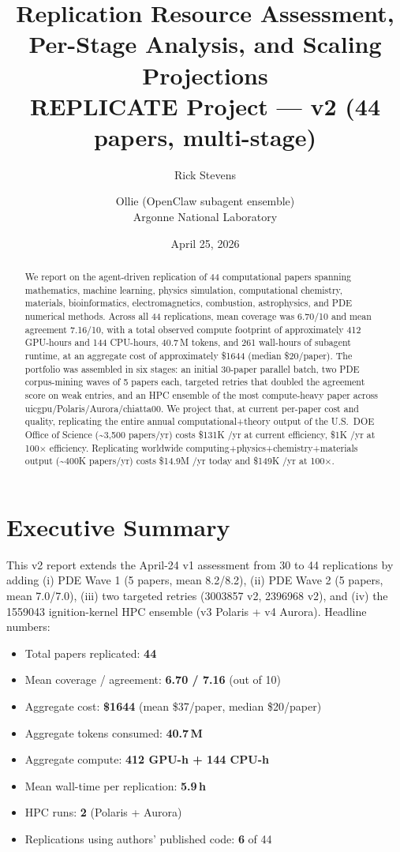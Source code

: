 \documentclass[11pt,letterpaper]{article}
\title{\textbf{Replication Resource Assessment, Per-Stage Analysis, and Scaling Projections}\\
\large REPLICATE Project --- v2 (44 papers, multi-stage)}
\author{Rick Stevens \and Ollie (OpenClaw subagent ensemble)\\Argonne National Laboratory}
\date{April 25, 2026}
\begin{document}
\maketitle

\begin{abstract}
We report on the agent-driven replication of 44 computational papers spanning mathematics, machine learning, physics simulation, computational chemistry, materials, bioinformatics, electromagnetics, combustion, astrophysics, and PDE numerical methods. Across all 44 replications, mean coverage was 6.70/10 and mean agreement 7.16/10, with a total observed compute footprint of approximately 412 GPU-hours and 144 CPU-hours, 40.7\,M tokens, and 261 wall-hours of subagent runtime, at an aggregate cost of approximately \$1644 (median \$20/paper). The portfolio was assembled in six stages: an initial 30-paper parallel batch, two PDE corpus-mining waves of 5 papers each, targeted retries that doubled the agreement score on weak entries, and an HPC ensemble of the most compute-heavy paper across uicgpu/Polaris/Aurora/chiatta00. We project that, at current per-paper cost and quality, replicating the entire annual computational+theory output of the U.S.\ DOE Office of Science (\textasciitilde{}3,500 papers/yr) costs \$131K /yr at current efficiency, \$1K /yr at 100$\times$ efficiency. Replicating worldwide computing+physics+chemistry+materials output (\textasciitilde{}400K papers/yr) costs \$14.9M /yr today and \$149K /yr at 100$\times$.
\end{abstract}

\section{Executive Summary}

This v2 report extends the April-24 v1 assessment from 30 to 44 replications by adding (i) PDE Wave 1 (5 papers, mean 8.2/8.2), (ii) PDE Wave 2 (5 papers, mean 7.0/7.0), (iii) two targeted retries (3003857 v2, 2396968 v2), and (iv) the 1559043 ignition-kernel HPC ensemble (v3 Polaris + v4 Aurora). Headline numbers:

\begin{itemize}
\item Total papers replicated: \textbf{44}
\item Mean coverage / agreement: \textbf{6.70 / 7.16} (out of 10)
\item Aggregate cost: \textbf{\$1644} (mean \$37/paper, median \$20/paper)
\item Aggregate tokens consumed: \textbf{40.7\,M}
\item Aggregate compute: \textbf{412 GPU-h + 144 CPU-h}
\item Mean wall-time per replication: \textbf{5.9\,h}
\item HPC runs: \textbf{2} (Polaris + Aurora)
\item Replications using authors' published code: \textbf{6} of 44
\end{itemize}
\end{document}
